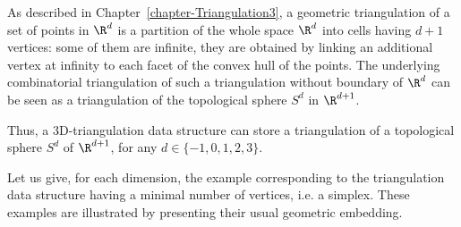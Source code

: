 As described in Chapter~\ref{chapter-Triangulation3}, a geometric
triangulation of a set of points in $\R^d$ is a partition of the
whole space $\R^d$ into cells having $d+1$ vertices: some of them
are infinite, they are obtained by linking an additional vertex at
infinity to each facet of the convex hull of the points.
The underlying combinatorial triangulation of such a triangulation
without boundary of $\R^d$ can be seen as a triangulation of the
topological sphere $S^d$ in $\R^{d+1}$. 

Thus, a 3D-triangulation data structure can store a triangulation of a
topological sphere $S^d$ of $\R^{d+1}$, for any $d \in \{-1,0,1,2,3\}$. 

Let us give, for each dimension, the example corresponding to the
triangulation data structure having a minimal number of vertices, i.e. a 
simplex. These examples are illustrated by presenting their usual
geometric embedding. 
